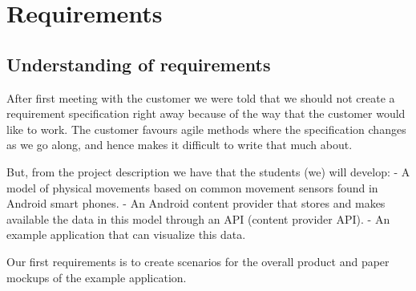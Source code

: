 \chapter{Requirements}
\section{Understanding of requirements}

After first meeting with the customer we were told that we should not create a requirement specification right away because of the
way that the customer would like to work. The customer favours agile methods where the specification changes as we go along, and 
hence makes it difficult to write that much about.

But, from the project description we have that the students (we) will develop:
- A model of physical movements based on common movement sensors found in Android smart phones.
- An Android content provider that stores and makes available the data in this model through an API (content provider API).
- An example application that can visualize this data.

Our first requirements is to create scenarios for the overall product and paper mockups of the example application.